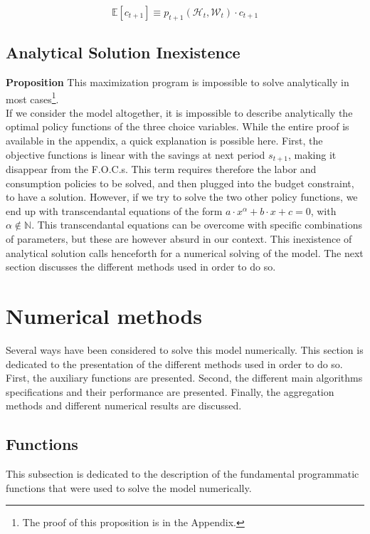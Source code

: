 \documentclass{article}
\begin{document}
$$\mathbb{E}\left[c_{t+1}\right] \equiv p_{t+1}(\mathcal{H}_{t},\mathcal{W}_{t}) \cdot c_{t+1}$$

\subsection{Analytical Solution Inexistence}

\textbf{Proposition}
This maximization program is impossible to solve analytically in most cases\footnote{The proof of this proposition is in the Appendix.}.
\\

If we consider the model altogether, it is impossible to describe 
analytically the optimal policy functions of the three choice variables.
While the entire proof is available in the appendix, a quick explanation
is possible here.
First, the objective functions is linear with the savings at next period $s_{t+1}$, 
making it disappear from the F.O.C.s.
This term requires therefore the labor and consumption policies to be solved, 
and then plugged into the budget constraint, to have a solution. 
However, if we try to solve the two other policy functions, 
we end up with transcendantal equations of the form $a\cdot x^{\alpha} + b\cdot x + c = 0$, 
with $\alpha\notin \mathbb{N}$. 
This transcendantal equations can be overcome with specific combinations 
of parameters, but these are however absurd in our context.
This inexistence of analytical solution calls henceforth for a numerical solving of the model.
The next section discusses the different methods used in order to do so.

\section{Numerical methods}

Several ways have been considered to solve this model numerically. 
This section is dedicated to the presentation of the different methods
used in order to do so. 
First, the auxiliary functions are presented. 
Second, the different main algorithms specifications and their performance are presented. 
Finally, the aggregation methods and different numerical results are discussed.

\subsection{Functions}

This subsection is dedicated to the description of the 
fundamental programmatic functions that were used to solve the model
numerically. 
\end{document}
